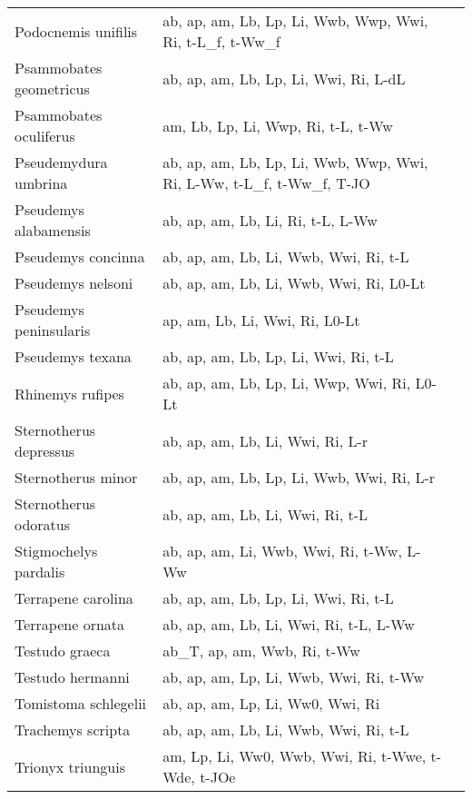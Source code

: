 \documentclass{article}
\begin{document}
{\begin{longtable}[c]{p{3.5cm}p{5.5cm}p{5.5cm}}
Podocnemis unifilis &  ab, ap, am, Lb, Lp, Li, Wwb, Wwp, Wwi, Ri, t-L\_f, t-Ww\_f & \citet{MeerRobi2016,MiorGiar2016} \\
Psammobates geometricus &  ab, ap, am, Lb, Lp, Li, Wwi, Ri, L-dL & \citet{Baar1995} \\
Psammobates oculiferus &  am, Lb, Lp, Li, Wwp, Ri, t-L, t-Ww & \citet{Kesw2012} \\
Pseudemydura umbrina &  ab, ap, am, Lb, Lp, Li, Wwb, Wwp, Wwi, Ri, L-Ww, t-L\_f, t-Ww\_f, T-JO & \citet{Arna2018,BurbKuch2010,Burb1981,ArnaKuch2015} \\
Pseudemys alabamensis &  ab, ap, am, Lb, Li, Ri, t-L, L-Ww & \citet{Grah1971} \\
Pseudemys concinna &  ab, ap, am, Lb, Li, Wwb, Wwi, Ri, t-L & \citet{Dres1997} \\
Pseudemys nelsoni &  ab, ap, am, Lb, Li, Wwb, Wwi, Ri, L0-Lt & \citet{MunsWald2015} \\
Pseudemys peninsularis &  ap, am, Lb, Li, Wwi, Ri, L0-Lt & \citet{MunsWald2015} \\
Pseudemys texana &  ab, ap, am, Lb, Lp, Li, Wwi, Ri, t-L & \citet{Lind2007} \\
Rhinemys rufipes &  ab, ap, am, Lb, Lp, Li, Wwp, Wwi, Ri, L0-Lt & \citet{MagnLima1997} \\
Sternotherus depressus &  ab, ap, am, Lb, Li, Wwi, Ri, L-r & \citet{MelaAngu2011} \\
Sternotherus minor &  ab, ap, am, Lb, Lp, Li, Wwb, Wwi, Ri, L-r & \citet{Beck2003,CoxHaze1991} \\
Sternotherus odoratus &  ab, ap, am, Lb, Li, Wwi, Ri, t-L & \citet{Erns1986} \\
Stigmochelys pardalis &  ab, ap, am, Li, Wwb, Wwi, Ri, t-Ww, L-Ww & \citet{RitzHamm2010} \\
Terrapene carolina &  ab, ap, am, Lb, Lp, Li, Wwi, Ri, t-L & \citet{ErnsWilg1998} \\
Terrapene ornata &  ab, ap, am, Lb, Li, Wwi, Ri, t-L, L-Ww & \citet{SkorAnde2021} \\
Testudo graeca &  ab\_T, ap, am, Wwb, Ri, t-Ww & \citet{HichZnar2016,RitzClau2012} \\
Testudo hermanni &  ab, ap, am, Lp, Li, Wwb, Wwi, Ri, t-Ww & \citet{RitzClau2012} \\
Tomistoma schlegelii &  ab, ap, am, Lp, Li, Ww0, Wwi, Ri & \\
Trachemys scripta &  ab, ap, am, Lb, Li, Wwb, Wwi, Ri, t-L & \citet{FrazGibb1990} \\
Trionyx triunguis &  am, Lp, Li, Ww0, Wwb, Wwi, Ri, t-Wwe, t-Wde, t-JOe & \citet{LeshAr1991} \\
\hline
\end{longtable}}
\end{document}
